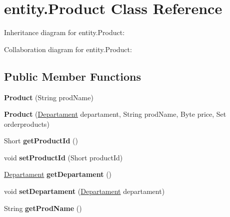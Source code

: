\hypertarget{classentity_1_1_product}{}\section{entity.\+Product Class Reference}
\label{classentity_1_1_product}


Inheritance diagram for entity.\+Product\+:


Collaboration diagram for entity.\+Product\+:
\subsection*{Public Member Functions}
\begin{DoxyCompactItemize}
\item 
\mbox{\label{classentity_1_1_product_a5c20116e136e01b4c3919ee4446551ac}} 
{\bfseries Product} (String prod\+Name)
\item 
\mbox{\label{classentity_1_1_product_aefcb6d85d34a0e81ad3f1f7db8b3cab1}} 
{\bfseries Product} (\mbox{\hyperlink{classentity_1_1_departament}{Departament}} departament, String prod\+Name, Byte price, Set orderproducts)
\item 
\mbox{\label{classentity_1_1_product_af05024d236d0c3b6b71ba8b770274cec}} 
Short {\bfseries get\+Product\+Id} ()
\item 
\mbox{\label{classentity_1_1_product_ab5f1b94906f3e47f8fe0625adf5745ce}} 
void {\bfseries set\+Product\+Id} (Short product\+Id)
\item 
\mbox{\label{classentity_1_1_product_a78bd5ae5f85a3d22bdd23b84c07f1ed4}} 
\mbox{\hyperlink{classentity_1_1_departament}{Departament}} {\bfseries get\+Departament} ()
\item 
\mbox{\label{classentity_1_1_product_aa67771d630e8eb1922b751a266df6a62}} 
void {\bfseries set\+Departament} (\mbox{\hyperlink{classentity_1_1_departament}{Departament}} departament)
\item 
\mbox{\label{classentity_1_1_product_ad215b898d498a54eb3cd193d8fc413aa}} 
String {\bfseries get\+Prod\+Name} ()

\end{DoxyCompactItemize}
